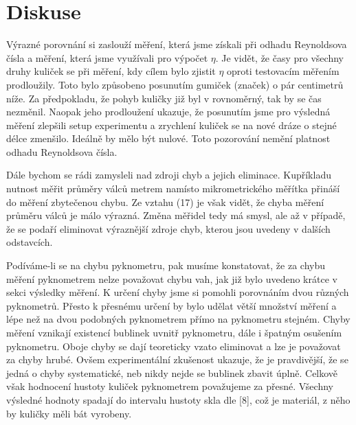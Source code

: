 \documentclass[a4paper]{article}
\begin{document}
\section*{Diskuse}
\par Výrazné porovnání si zaslouží měření, která jsme získali při odhadu Reynoldsova čísla a měření, která jsme využívali pro výpočet $\eta$. Je vidět, že časy pro všechny druhy kuliček se při měření, kdy cílem bylo zjistit $\eta$ oproti testovacím měřením prodloužily. Toto bylo způsobeno posunutím gumiček (značek) o pár centimetrů níže. Za předpokladu, že pohyb kuličky již byl v rovnoměrný, tak by se čas nezměnil. Naopak jeho prodloužení ukazuje, že posunutím jsme pro výsledná měření zlepšili setup experimentu a zrychlení kuliček se na nové dráze o stejné délce zmenšilo. Ideálně by mělo být nulové. Toto pozorování nemění platnost odhadu Reynoldsova čísla.
\par Dále bychom se rádi zamysleli nad zdroji chyb a jejich eliminace. Kupříkladu nutnost měřit průměry válců metrem namísto mikrometrického měřítka přináší do měření zbytečenou chybu. Ze vztahu (17) je však vidět, že chyba měření průměru válců je málo výrazná. Změna měřidel tedy má smysl, ale až v případě, že se podaří eliminovat výraznější zdroje chyb, kterou jsou uvedeny v dalších odstavcích.
\par Podíváme-li se na chybu pyknometru, pak musíme konstatovat, že za chybu měření pyknometrem nelze považovat chybu vah, jak již bylo uvedeno krátce v sekci výsledky měření. K určení chyby jsme si pomohli porovnáním dvou různých pyknometrů. Přesto k přesnému určení by bylo udělat větší množství měření a lépe než na dvou podobných pyknometrem přímo na pyknometru stejném. Chyby měření vznikají existencí bublinek uvnitř pyknometru, dále i špatným osušením pyknometru. Oboje chyby se dají teoreticky vzato eliminovat a lze je považovat za chyby hrubé. Ovšem experimentální zkušenost ukazuje, že je pravdivější, že se jedná o chyby systematické, neb nikdy nejde se bublinek zbavit úplně. Celkově však hodnocení hustoty kuliček pyknometrem považujeme za přesné. Všechny výsledné hodnoty spadají do intervalu hustoty skla dle [8], což je materiál, z něho by kuličky měli bát vyrobeny.
\end{document}
